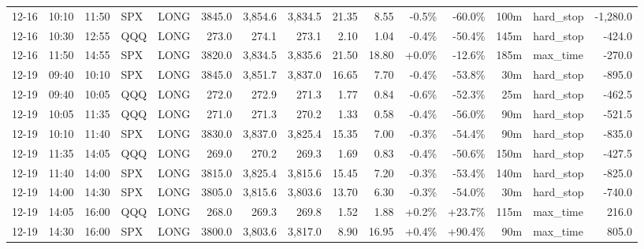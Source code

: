 \documentclass[11pt,a4paper,twoside]{article}
\begin{document}
\begin{landscape}
\begin{center}
\begin{longtable}{>{\color{txtmain}}l l l l l r r r r r r r r >{\color{txtmain}}l r}
12-16 & 10:10 & 11:50 & SPX & LONG & 3845.0 & 3,854.6 & 3,834.5 & 21.35 & 8.55 & \textcolor{lossred}{-0.5\%} & \textcolor{lossred}{-60.0\%} & 100m & hard\_stop & \textcolor{lossred}{-1,280.0} \\
12-16 & 10:30 & 12:55 & QQQ & LONG & 273.0 & 274.1 & 273.1 & 2.10 & 1.04 & \textcolor{lossred}{-0.4\%} & \textcolor{lossred}{-50.4\%} & 145m & hard\_stop & \textcolor{lossred}{-424.0} \\
12-16 & 11:50 & 14:55 & SPX & LONG & 3820.0 & 3,834.5 & 3,835.6 & 21.50 & 18.80 & \textcolor{wingreen}{+0.0\%} & \textcolor{lossred}{-12.6\%} & 185m & max\_time & \textcolor{lossred}{-270.0} \\
12-19 & 09:40 & 10:10 & SPX & LONG & 3845.0 & 3,851.7 & 3,837.0 & 16.65 & 7.70 & \textcolor{lossred}{-0.4\%} & \textcolor{lossred}{-53.8\%} & 30m & hard\_stop & \textcolor{lossred}{-895.0} \\
12-19 & 09:40 & 10:05 & QQQ & LONG & 272.0 & 272.9 & 271.3 & 1.77 & 0.84 & \textcolor{lossred}{-0.6\%} & \textcolor{lossred}{-52.3\%} & 25m & hard\_stop & \textcolor{lossred}{-462.5} \\
12-19 & 10:05 & 11:35 & QQQ & LONG & 271.0 & 271.3 & 270.2 & 1.33 & 0.58 & \textcolor{lossred}{-0.4\%} & \textcolor{lossred}{-56.0\%} & 90m & hard\_stop & \textcolor{lossred}{-521.5} \\
12-19 & 10:10 & 11:40 & SPX & LONG & 3830.0 & 3,837.0 & 3,825.4 & 15.35 & 7.00 & \textcolor{lossred}{-0.3\%} & \textcolor{lossred}{-54.4\%} & 90m & hard\_stop & \textcolor{lossred}{-835.0} \\
12-19 & 11:35 & 14:05 & QQQ & LONG & 269.0 & 270.2 & 269.3 & 1.69 & 0.83 & \textcolor{lossred}{-0.4\%} & \textcolor{lossred}{-50.6\%} & 150m & hard\_stop & \textcolor{lossred}{-427.5} \\
12-19 & 11:40 & 14:00 & SPX & LONG & 3815.0 & 3,825.4 & 3,815.6 & 15.45 & 7.20 & \textcolor{lossred}{-0.3\%} & \textcolor{lossred}{-53.4\%} & 140m & hard\_stop & \textcolor{lossred}{-825.0} \\
12-19 & 14:00 & 14:30 & SPX & LONG & 3805.0 & 3,815.6 & 3,803.6 & 13.70 & 6.30 & \textcolor{lossred}{-0.3\%} & \textcolor{lossred}{-54.0\%} & 30m & hard\_stop & \textcolor{lossred}{-740.0} \\
12-19 & 14:05 & 16:00 & QQQ & LONG & 268.0 & 269.3 & 269.8 & 1.52 & 1.88 & \textcolor{wingreen}{+0.2\%} & \textcolor{wingreen}{+23.7\%} & 115m & max\_time & \textcolor{wingreen}{216.0} \\
12-19 & 14:30 & 16:00 & SPX & LONG & 3800.0 & 3,803.6 & 3,817.0 & 8.90 & 16.95 & \textcolor{wingreen}{+0.4\%} & \textcolor{wingreen}{+90.4\%} & 90m & max\_time & \textcolor{wingreen}{805.0} \\

\end{longtable}
\end{center}
\end{landscape}
\end{document}
